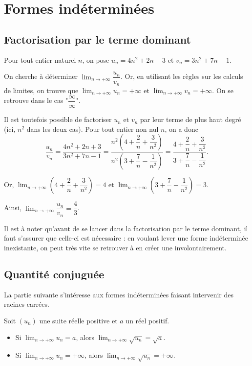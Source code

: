 \documentclass[11pt,fleqn]{book} %
\begin{document}
\section{Formes indéterminées}

\subsection{Factorisation par le terme dominant}

\begin{example} Pour tout entier naturel $n$, on pose $u_n=4n^2+2n+3$ et $v_n = 3n^2+7n-1$. 

On cherche à déterminer $\displaystyle \lim_{n \to +\infty} \dfrac{u_n}{v_n}$. Or, en utilisant les règles sur les calculs de limites, on trouve que $\displaystyle \lim_{n \to +\infty} u_n = +\infty$ et $\displaystyle \lim_{n \to +\infty} v_n = +\infty$. On se retrouve dans le cas "$\dfrac{\infty}{\infty}$".

Il est toutefois possible de factoriser $u_n$ et $v_n$ par leur terme de plus haut degré (ici, $n^2$ dans les deux cas). Pour tout entier non nul $n$, on a donc 
\[ \dfrac{u_n}{v_n}=\dfrac{4n^2+2n+3}{3n^2+7n-1}=\dfrac{n^2\left(4+\dfrac{2}{n}+\dfrac{3}{n^2}\right)}{n^2\left(3+\dfrac{7}{n}-\dfrac{1}{n^2}\right)}=\dfrac{4+\dfrac{2}{n}+\dfrac{3}{n^2}}{3+\dfrac{7}{n}-\dfrac{1}{n^2}}.\]

Or,  $\displaystyle \lim_{n \to +\infty}\left(4+\dfrac{2}{n}+\dfrac{3}{n^2}\right) = 4$ et $\displaystyle \lim_{n \to +\infty} \left(3+\dfrac{7}{n}-\dfrac{1}{n^2}\right) = 3$.

Ainsi, $\displaystyle \lim_{n \to +\infty} \dfrac{u_n}{v_n} = \dfrac{4}{3}$.
\end{example}

Il est à noter qu'avant de se lancer dans la factorisation par le terme dominant, il faut s'assurer que celle-ci est nécessaire : en voulant lever une forme indéterminée inexistante, on peut très vite se retrouver à en créer une involontairement.

\subsection{Quantité conjuguée}

La partie suivante s'intéresse aux formes indéterminées faisant intervenir des racines carrées.

\begin{proposition}Soit $(u_n)$ une suite réelle positive et $a$ un réel positif.
\begin{itemize}
\item Si $\displaystyle \lim_{n \to +\infty} u_n=a$, alors $\displaystyle \lim_{n \to +\infty} \sqrt{u_n}=\sqrt{a}$.
\item Si $\displaystyle \lim_{n \to +\infty} u_n=+\infty$, alors $\displaystyle \lim_{n \to +\infty} \sqrt{u_n}=+\infty$.
\end{itemize}\end{proposition}
\end{document}
